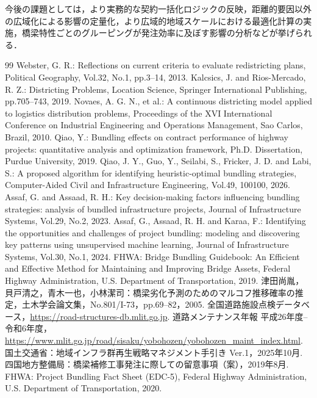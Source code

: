 \documentclass[Journal,letterpaper,InsideFigs,NoLineNumbers]{ascelike-new}
\begin{document}
今後の課題としては，より実務的な契約一括化ロジックの反映，距離的要因以外の広域化による影響の定量化，より広域的地域スケールにおける最適化計算の実施，橋梁特性ごとのグルーピングが発注効率に及ぼす影響の分析などが挙げられる．

\begin{thebibliography}{99}
Webster, G. R.: Reflections on current criteria to evaluate redistricting plans, Political Geography, Vol.32, No.1, pp.3--14, 2013.
Kalcsics, J. and Rios-Mercado, R. Z.: Districting Problems, Location Science, Springer International Publishing, pp.705--743, 2019.
Novaes, A. G. N., et al.: A continuous districting model applied to logistics distribution problems, Proceedings of the XVI International Conference on Industrial Engineering and Operations Management, Sao Carlos, Brazil, 2010.
Qiao, Y.: Bundling effects on contract performance of highway projects: quantitative analysis and optimization framework, Ph.D. Dissertation, Purdue University, 2019.
Qiao, J. Y., Guo, Y., Seilabi, S., Fricker, J. D. and Labi, S.: A proposed algorithm for identifying heuristic-optimal bundling strategies, Computer-Aided Civil and Infrastructure Engineering, Vol.49, 100100, 2026.
Assaf, G. and Assaad, R. H.: Key decision-making factors influencing bundling strategies: analysis of bundled infrastructure projects, Journal of Infrastructure Systems, Vol.29, No.2, 2023.
Assaf, G., Assaad, R. H. and Karaa, F.: Identifying the opportunities and challenges of project bundling: modeling and discovering key patterns using unsupervised machine learning, Journal of Infrastructure Systems, Vol.30, No.1, 2024.
FHWA: Bridge Bundling Guidebook: An Efficient and Effective Method for Maintaining and Improving Bridge Assets, Federal Highway Administration, U.S. Department of Transportation, 2019.
津田尚胤，貝戸清之，青木一也，小林潔司：橋梁劣化予測のためのマルコフ推移確率の推定，土木学会論文集，No.801/I-73，pp.69--82，2005.
全国道路施設点検データベース，\url{https://road-structures-db.mlit.go.jp}.
道路メンテナンス年報 平成26年度--令和6年度，\url{https://www.mlit.go.jp/road/sisaku/yobohozen/yobohozen_maint_index.html}.
国土交通省：地域インフラ群再生戦略マネジメント手引き Ver.1，2025年10月.
四国地方整備局：橋梁補修工事発注に際しての留意事項（案），2019年8月.
FHWA: Project Bundling Fact Sheet (EDC-5), Federal Highway Administration, U.S. Department of Transportation, 2020.

\end{thebibliography}
\end{document}
